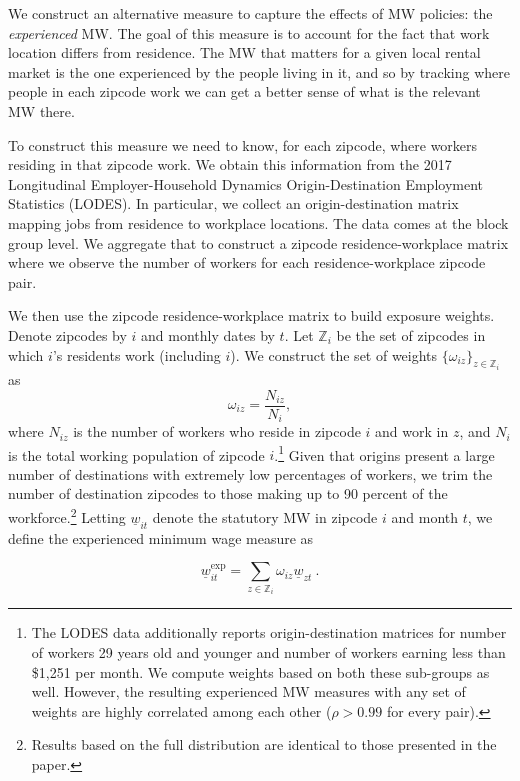 We construct an alternative measure to capture the effects of MW policies: the 
\textit{experienced} MW. The goal of this measure is to account for the fact that work 
location differs from residence. The MW that matters for a given local rental market 
is the one experienced by the people living in it, and so by tracking where people in 
each zipcode work we can get a better sense of what is the relevant MW there.

To construct this measure we need to know, for each zipcode, where workers residing in that 
zipcode work. We obtain this information from the 2017 Longitudinal Employer-Household 
Dynamics Origin-Destination Employment Statistics (LODES). In particular, we collect an 
origin-destination matrix mapping jobs from residence to workplace locations. The data 
comes at the block group level. We aggregate that to construct a zipcode residence-workplace
matrix where we observe the number of workers for each residence-workplace zipcode pair.

We then use the zipcode residence-workplace matrix to build exposure weights. Denote 
zipcodes by $i$ and monthly dates by $t$. Let $\mathds{Z}_i$ be the set of zipcodes in 
which $i$'s residents work (including $i$). We construct the set of weights 
$\{\omega_{iz}\}_{z \in \mathds{Z}_i}$ as $$\omega_{iz} = \frac{N_{iz}}{N_i} , $$ where 
$N_{iz}$ is the number of workers who reside in zipcode $i$ and work in $z$, and $N_i$ 
is the total working population of zipcode $i$.\footnote{The LODES data additionally 
	reports origin-destination matrices for number of workers 29 years old and younger  
	and number of workers earning less than \$1,251 per month. We compute weights based 
	on both these sub-groups as well. However, the resulting experienced MW measures with
	any set of weights are highly correlated among each other ($\rho>0.99$ for every pair).} 
Given that origins present a large number of destinations with extremely low percentages of 
workers, we trim the number of destination zipcodes to those making up to 90 percent of the 
workforce.\footnote{Results based on the full distribution are identical to those presented
	in the paper.} 
Letting $\underline{w}_{it}$ denote the statutory MW in zipcode $i$ and month $t$, we 
define the experienced minimum wage measure as

\begin{equation}
	\underline{w}^{\text{exp}}_{it} = 
			\sum_{z \in \mathds{Z}_i} \omega_{iz} \underline{w}_{zt} \ . 
\end{equation}

